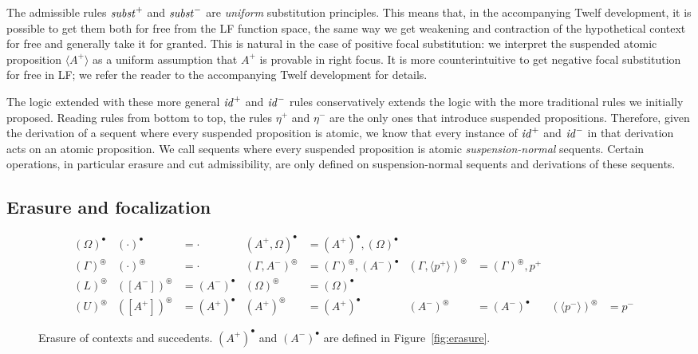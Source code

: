 \documentclass[acmtocl]{robtrans}\pdfoutput=1
\newcommand{\susp}[1]{\langle{#1}\rangle}
\begin{document}
The admissible rules ${\it subst}^+$ and ${\it subst}^-$ are {\it
  uniform} substitution principles. This means that, in the
accompanying Twelf development, it is possible to get them both for
free from the LF function space, the same way we get weakening 
and contraction of the
hypothetical context for free and generally take it for granted. This
is natural in the case of positive focal substitution: we interpret
the suspended atomic proposition $\susp{A^+}$ as a uniform assumption
that $A^+$ is provable in right focus. It is more counterintuitive to
get negative focal substitution for free in LF; we refer the reader to
the accompanying Twelf development for details. 

The logic extended with these more general ${\it id}^+$ and ${\it
  id}^-$ rules conservatively extends the logic with the more
traditional rules we initially proposed. Reading rules from bottom to
top, the rules $\eta^+$ and $\eta^-$ are the only ones that introduce
suspended propositions. Therefore, given the derivation of a sequent
where every suspended proposition is atomic, we know that every
instance of ${\it id}^+$ and ${\it id}^-$ in that derivation acts on an
atomic proposition. We call sequents where every suspended proposition
is atomic {\it suspension-normal} sequents. Certain operations, in
particular erasure and cut admissibility, are only defined on
suspension-normal sequents and derivations of these sequents.


\subsection{Erasure and focalization}

\begin{figure}
\begin{align*}
 & (\Omega)^\bullet
 & (\cdot)^\bullet & = \cdot
 & (A^+, \Omega)^\bullet & = (A^+)^\bullet, (\Omega)^\bullet
\\
 & (\Gamma)^\circledast
 & (\cdot)^\circledast & = \cdot 
 & (\Gamma, A^-)^\circledast & = (\Gamma)^\circledast, (A^-)^\bullet
 & (\Gamma, \susp{p^+})^\circledast & = (\Gamma)^\circledast, p^+
\\
 & (L)^\circledast
 & ([A^-])^\circledast & = (A^-)^\bullet
 & (\Omega)^\circledast & = (\Omega)^\bullet
\\
 & (U)^\circledast
 & ([A^+])^\circledast & = (A^+)^\bullet
 & (A^+)^\circledast & = (A^+)^\bullet
 & (A^-)^\circledast & = (A^-)^\bullet
 & (\susp{p^-})^\circledast & = p^-
\end{align*}
\caption{Erasure of contexts and succedents. $(A^+)^\bullet$ and
  $(A^-)^\bullet$ are defined in Figure~\ref{fig:erasure}.}
\label{fig:erasure-ctx}
\end{figure}
\end{document}
